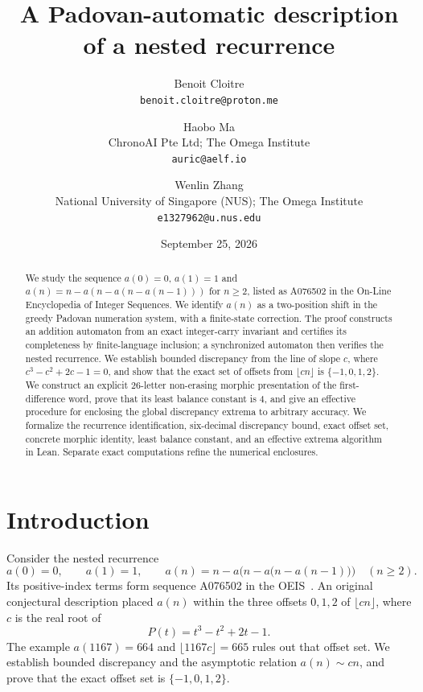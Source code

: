 \documentclass[11pt,a4paper]{article}
\title{A Padovan-automatic description\\of a nested recurrence}
\author{
Benoit Cloitre\\[-2pt]
\small\texttt{benoit.cloitre@proton.me}
\and
Haobo Ma\\[-2pt]
\small ChronoAI Pte Ltd; The Omega Institute\\[-2pt]
\small\texttt{auric@aelf.io}
\and
Wenlin Zhang\\[-2pt]
\small National University of Singapore (NUS); The Omega Institute\\[-2pt]
\small\texttt{e1327962@u.nus.edu}
}
\date{September 25, 2026}
\numberwithin{equation}{section}
\theoremstyle{remark}
\begin{document}
\maketitle
\begin{abstract}
We study the sequence $a(0)=0$, $a(1)=1$ and
$a(n)=n-a(n-a(n-a(n-1)))$ for $n\ge2$, listed as A076502 in the
On-Line Encyclopedia of Integer Sequences. We identify $a(n)$ as a
two-position shift in the greedy Padovan numeration system, with a finite-state
correction. The proof constructs an addition automaton from an exact
integer-carry invariant and certifies its completeness by finite-language
inclusion; a synchronized automaton then verifies the nested recurrence.
We establish bounded discrepancy from the line of slope $c$, where
$c^3-c^2+2c-1=0$, and show that the exact set of offsets from $\lfloor cn\rfloor$
is $\{-1,0,1,2\}$. We construct an explicit $26$-letter non-erasing morphic
presentation of the first-difference word, prove that its least balance
constant is $4$, and give an effective procedure for enclosing the global
discrepancy extrema to arbitrary accuracy. We formalize the recurrence
identification, six-decimal discrepancy bound, exact offset set, concrete
morphic identity, least balance constant, and an effective extrema algorithm
in Lean. Separate exact computations refine the numerical enclosures.
\end{abstract}

\section{Introduction}
Consider the nested recurrence
\begin{equation}\label{eq:recurrence}
 a(0)=0,\qquad a(1)=1,\qquad
 a(n)=n-a\bigl(n-a\bigl(n-a(n-1)\bigr)\bigr)\quad(n\ge2).
\end{equation}
Its positive-index terms form sequence A076502 in the OEIS~\cite{OEIS}.
An original conjectural description placed $a(n)$ within the three offsets
$0,1,2$ of $\lfloor cn\rfloor$, where $c$ is the real root of
\begin{equation}\label{eq:cubic}
 P(t)=t^3-t^2+2t-1.
\end{equation}
The example $a(1167)=664$ and $\lfloor1167c\rfloor=665$ rules out that
offset set. We establish bounded discrepancy and the asymptotic relation
$a(n)\sim cn$, and prove that the exact offset set is $\{-1,0,1,2\}$.
\end{document}
